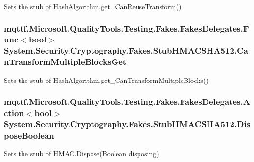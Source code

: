 Sets the stub of Hash\-Algorithm.\-get\-\_\-\-Can\-Reuse\-Transform()

\hypertarget{class_system_1_1_security_1_1_cryptography_1_1_fakes_1_1_stub_h_m_a_c_s_h_a512_ad44c68431af30026f7ad80b7796c2165}{
\subsubsection[{Can\-Transform\-Multiple\-Blocks\-Get}]{\setlength{\rightskip}{0pt plus 5cm}mqttf.\-Microsoft.\-Quality\-Tools.\-Testing.\-Fakes.\-Fakes\-Delegates.\-Func$<$bool$>$ System.\-Security.\-Cryptography.\-Fakes.\-Stub\-H\-M\-A\-C\-S\-H\-A512.\-Can\-Transform\-Multiple\-Blocks\-Get}}\label{class_system_1_1_security_1_1_cryptography_1_1_fakes_1_1_stub_h_m_a_c_s_h_a512_ad44c68431af30026f7ad80b7796c2165}


Sets the stub of Hash\-Algorithm.\-get\-\_\-\-Can\-Transform\-Multiple\-Blocks()

\hypertarget{class_system_1_1_security_1_1_cryptography_1_1_fakes_1_1_stub_h_m_a_c_s_h_a512_a6e8085892f82ce8cad21f9236f26401b}{
\subsubsection[{Dispose\-Boolean}]{\setlength{\rightskip}{0pt plus 5cm}mqttf.\-Microsoft.\-Quality\-Tools.\-Testing.\-Fakes.\-Fakes\-Delegates.\-Action$<$bool$>$ System.\-Security.\-Cryptography.\-Fakes.\-Stub\-H\-M\-A\-C\-S\-H\-A512.\-Dispose\-Boolean}}\label{class_system_1_1_security_1_1_cryptography_1_1_fakes_1_1_stub_h_m_a_c_s_h_a512_a6e8085892f82ce8cad21f9236f26401b}


Sets the stub of H\-M\-A\-C.\-Dispose(\-Boolean disposing)

